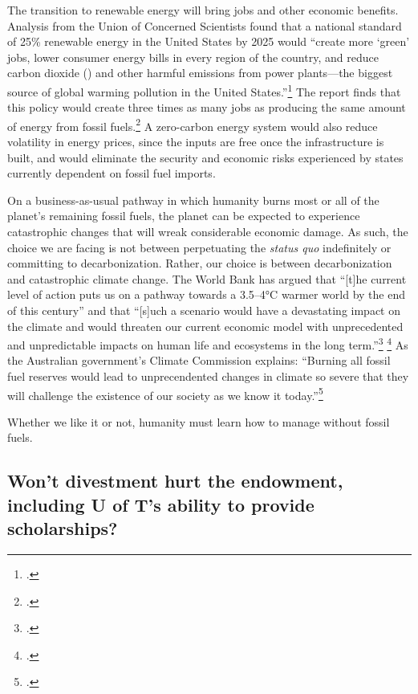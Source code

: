 The transition to renewable energy will bring jobs and other economic benefits.
Analysis from the Union of Concerned Scientists found that a national standard of 25\% renewable energy in the United States by 2025 would ``create more `green' jobs, lower consumer energy bills in every region of the country, and reduce carbon dioxide () and other harmful emissions from power plants—the biggest source of global warming pollution in the United States.''\footcite[][]{ConcernedScientistsJobs}
The report finds that this policy would create three times as many jobs as producing the same amount of energy from fossil fuels.\footcite[See also: ][]{CSBenefitsRenewable}
A zero-carbon energy system would also reduce volatility in energy prices, since the inputs are free once the infrastructure is built, and would eliminate the security and economic risks experienced by states currently dependent on fossil fuel imports.



On a business-as-usual pathway in which humanity burns most or all of the planet's remaining fossil fuels, the planet can be expected to experience catastrophic changes that will wreak considerable economic damage.
As such, the choice we are facing is not between perpetuating the \emph{status quo} indefinitely or committing to decarbonization.
Rather, our choice is between decarbonization and catastrophic climate change.
The World Bank has argued that ``[t]he current level of action puts us on a pathway towards a 3.5–4°C warmer world by the end of this century'' and that ``[s]uch a scenario would have a devastating impact on the climate and would threaten our current economic model with unprecedented and unpredictable impacts on human life and ecosystems in the long term.''\footcite[][p. 13]{WorldBankCarbonPricing} \footcite[See also:][]{WoesReverse}
As the Australian government's Climate Commission explains: ``Burning all fossil fuel reserves would lead to unprecendented changes in climate so severe that they will challenge the existence of our society as we know it today.''\footcite[][p. 5]{CriticalDecade2013}


Whether we like it or not, humanity must learn how to manage without fossil fuels.



	\subsection{Won't divestment hurt the endowment, including U of T's ability to provide scholarships?}
	\label{HurtEndowment}
	
